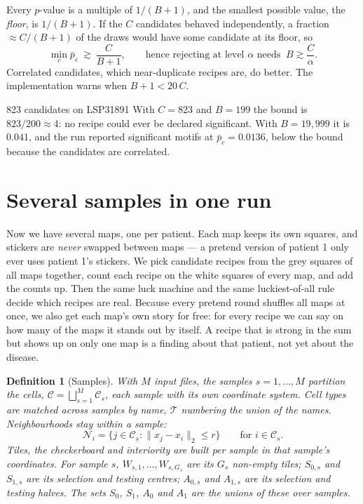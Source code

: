 \documentclass[11pt,a4paper]{article}
\newtheorem{definition}{Definition}[section]
\theoremstyle{remark}
\newcommand{\cells}{\mathcal{C}}
\newcommand{\types}{\mathcal{T}}
\newcommand{\Nb}[1]{\mathcal{N}_{#1}}
\begin{document}
Every $p$-value is a multiple of $1/(B+1)$, and the smallest possible value,
the \emph{floor}, is $1/(B+1)$. If the $C$ candidates behaved independently, a
fraction $\approx C/(B+1)$ of the draws would have some candidate at its
floor, so
\[
  \min_{c}\bar p_c\ \gtrsim\ \frac{C}{B+1},
  \qquad\text{hence rejecting at level }\alpha\text{ needs }\ B\gtrsim\frac{C}{\alpha}.
\]
Correlated candidates, which near-duplicate recipes are, do better. The
implementation warns when $B+1<20\,C$.

\begin{example}{823 candidates on LSP31891}
With $C=823$ and $B=199$ the bound is $823/200\approx4$: no recipe could ever
be declared significant. With $B=19{,}999$ it is $0.041$, and the run
reported significant motifs at $\bar p_c=0.0136$, below the bound because the
candidates are correlated.
\end{example}

\section{Several samples in one run}
\label{sec:multi}

\begin{plain}
Now we have several maps, one per patient. Each map keeps its own squares, and
stickers are \emph{never} swapped between maps --- a pretend version of patient
1 only ever uses patient 1's stickers. We pick candidate recipes from the grey
squares of all maps together, count each recipe on the white squares of every
map, and add the counts up. Then the same luck machine and the same
luckiest-of-all rule decide which recipes are real. Because every pretend round
shuffles all maps at once, we also get each map's own story for free: for
every recipe we can say on how many of the maps it stands out by itself. A
recipe that is strong in the sum but shows up on only one map is a finding
about that patient, not yet about the disease.
\end{plain}

\begin{definition}[Samples]
\label{def:samples}
With $M$ input files, the samples $s=1,\dots,M$ partition the cells,
$\cells=\bigsqcup_{s=1}^M\cells_s$, each sample with its own coordinate
system. Cell types are matched across samples by name, $\types$ numbering the
union of the names. Neighbourhoods stay within a sample:
\[
  \Nb{i}=\{j\in\cells_s:\lVert x_j-x_i\rVert_2\le r\}\qquad\text{for }i\in\cells_s.
\]
Tiles, the checkerboard and interiority are built per sample in that
sample's coordinates. For sample $s$, $W_{s,1},\dots,W_{s,G_s}$ are its $G_s$
non-empty tiles; $S_{0,s}$ and $S_{1,s}$ are its selection and testing
centres; $A_{0,s}$ and $A_{1,s}$ are its selection and testing halves. The
sets $S_0$, $S_1$, $A_0$ and $A_1$ are the unions of these over samples.
\end{definition}
\end{document}
